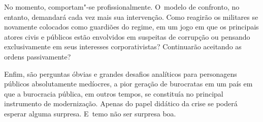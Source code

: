 No momento, comportam"-se profissionalmente. O~modelo de confronto, no
entanto, demandará cada vez mais sua intervenção. Como reagirão os
militares se novamente colocados como guardiões do regime, em um jogo em
que os principais atores civis e públicos estão envolvidos em suspeitas
de corrupção ou pensando exclusivamente em seus interesses
corporativistas? Continuarão aceitando as ordens passivamente?

Enfim, são perguntas óbvias e grandes desafios analíticos para
personagens públicos absolutamente medíocres, a pior geração de
burocratas em um país em que a burocracia pública, em outros tempos, se
constituía no principal instrumento de modernização. Apenas do papel
didático da crise se poderá esperar alguma surpresa. E~temo não ser
surpresa boa.
